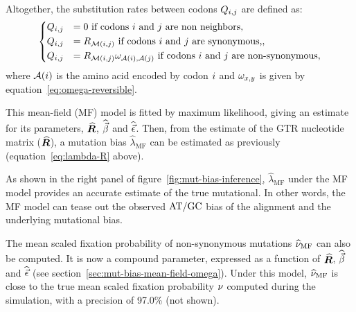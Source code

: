 Altogether, the substitution rates between codons $Q_{{i}, {j}}$ are defined as:
\begin{equation}
    \begin{dcases}
        Q_{{i}, {j}} & = 0 \text{ if codons ${i}$ and ${j}$ are non neighbors}, \\
        Q_{{i}, {j}} & = R_{\mathcal{M}({i}, {j})} \text{ if codons ${i}$ and ${j}$ are synonymous,}, \\
        Q_{{i}, {j}} & = R_{\mathcal{M}({i}, {j})} \omega_{\mathcal{A}({i}), \mathcal{A}({j})} \text{ if codons ${i}$ and ${j}$ are non-synonymous},
    \end{dcases}
    \label{eq:codon-mean-field}
\end{equation}
where $\mathcal{A}({i})$ is the amino acid encoded by codon ${i}$ and $\omega_{x, y}$ is given by equation~\ref{eq:omega-reversible}.

This mean-field (MF) model is fitted by maximum likelihood, giving an estimate for its parameters, $\widehat{\bm{R}}$, $\widehat{\vec{\beta}}$ and $\widehat{\vec{\epsilon}}$.
Then, from the estimate of the GTR nucleotide matrix ($\widehat{\bm{R}}$), a mutation bias $\widehat{\lambda}_{\text{MF}}$ can be estimated as previously (equation~\ref{eq:lambda-R} above).

As shown in the right panel of figure~\ref{fig:mut-bias-inference}, $\widehat{\lambda}_{\text{MF}}$ under the MF model provides an accurate estimate of the true mutational.
In other words, the MF model can tease out the observed $\text{AT/GC}$ bias of the alignment and the underlying mutational bias.

The mean scaled fixation probability of non-synonymous mutations $\widehat{\nu}_{\text{MF}}$ can also be computed.
It is now a compound parameter, expressed as a function of $\widehat{\bm{R}}$, $\widehat{\vec{\beta}}$ and $\widehat{\vec{\epsilon}}$ (see section~\ref{sec:mut-bias-mean-field-omega}).
Under this model, $\widehat{\nu}_{\text{MF}}$ is close to the true mean scaled fixation probability $\nu$ computed during the simulation, with a precision of 97.0\% (not shown).

